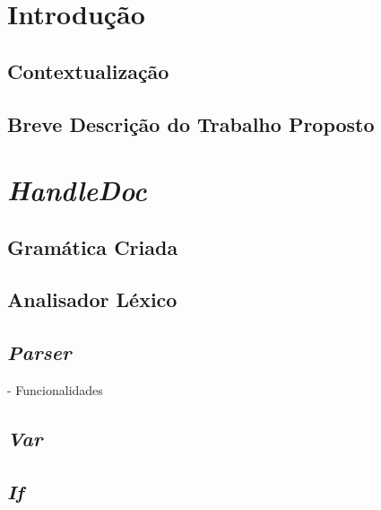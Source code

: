 \documentclass[11pt]{report}
\begin{document}
\maketitle    

\tableofcontents


%
%
%
\chapter{Introdução}
\section{Contextualização} 



\section{Breve Descrição do Trabalho Proposto}



\chapter{\textit{HandleDoc}}
\section{Gramática Criada} \label{subsec:grammar}

\section{Analisador Léxico} \label{subsec:lex}

\section{\textit{Parser}} \label{subsec:strat}

- Funcionalidades

\section{\textit{Var}} \label{subsec:var}


\section{\textit{If}} \label{subsec:If}

\end{document}
